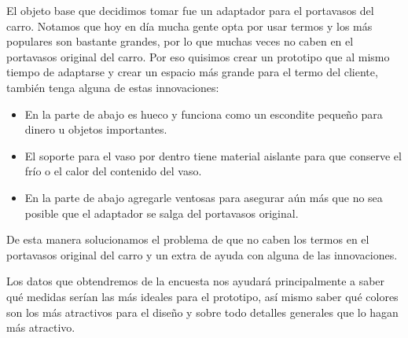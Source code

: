     El objeto base que decidimos tomar fue un adaptador para el portavasos del carro. Notamos que hoy en día mucha gente opta por usar termos y los más populares son bastante grandes, por lo que muchas veces no caben en el portavasos original del carro. Por eso quisimos crear un prototipo que al mismo tiempo de adaptarse y crear un espacio más grande para el termo del cliente, también tenga alguna de estas innovaciones:
\begin{itemize}
    \item En la parte de abajo es hueco y funciona como un escondite pequeño para dinero u objetos importantes.
    \item El soporte para el vaso por dentro tiene material aislante para que conserve el frío o el calor del contenido del vaso.
    \item En la parte de abajo agregarle ventosas para asegurar aún más que no sea posible que el adaptador se salga del portavasos original. 
\end{itemize}
De esta manera solucionamos el problema de que no caben los termos en el portavasos original del carro y un extra de ayuda con alguna de las innovaciones. 

Los datos que obtendremos de la encuesta nos ayudará principalmente a saber qué medidas serían las más ideales para el prototipo, así mismo saber qué colores son los más atractivos para el diseño y sobre todo detalles generales que lo hagan más atractivo. 

